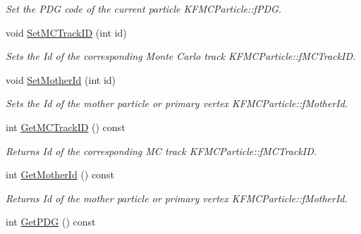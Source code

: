 \begin{DoxyCompactItemize}
\begin{DoxyCompactList}\small\item\em Set the P\+DG code of the current particle K\+F\+M\+C\+Particle\+::f\+P\+DG. \end{DoxyCompactList}\item 
void \hyperlink{classKFMCParticle_a4fe74ad782d04824601179c61085d82e}{Set\+M\+C\+Track\+ID} (int id)\hypertarget{classKFMCParticle_a4fe74ad782d04824601179c61085d82e}{}\label{classKFMCParticle_a4fe74ad782d04824601179c61085d82e}

\begin{DoxyCompactList}\small\item\em Sets the Id of the corresponding Monte Carlo track K\+F\+M\+C\+Particle\+::f\+M\+C\+Track\+ID. \end{DoxyCompactList}\item 
void \hyperlink{classKFMCParticle_aefeec3e0848ea6e94dfd48ba7dae077e}{Set\+Mother\+Id} (int id)\hypertarget{classKFMCParticle_aefeec3e0848ea6e94dfd48ba7dae077e}{}\label{classKFMCParticle_aefeec3e0848ea6e94dfd48ba7dae077e}

\begin{DoxyCompactList}\small\item\em Sets the Id of the mother particle or primary vertex K\+F\+M\+C\+Particle\+::f\+Mother\+Id. \end{DoxyCompactList}\item 
int \hyperlink{classKFMCParticle_adbf6a0b3aa66d2488e0dd35cd39e5307}{Get\+M\+C\+Track\+ID} () const \hypertarget{classKFMCParticle_adbf6a0b3aa66d2488e0dd35cd39e5307}{}\label{classKFMCParticle_adbf6a0b3aa66d2488e0dd35cd39e5307}

\begin{DoxyCompactList}\small\item\em Returns Id of the corresponding MC track K\+F\+M\+C\+Particle\+::f\+M\+C\+Track\+ID. \end{DoxyCompactList}\item 
int \hyperlink{classKFMCParticle_a1cd7e3ef51e4e2bb2ea3558feb5ab869}{Get\+Mother\+Id} () const \hypertarget{classKFMCParticle_a1cd7e3ef51e4e2bb2ea3558feb5ab869}{}\label{classKFMCParticle_a1cd7e3ef51e4e2bb2ea3558feb5ab869}

\begin{DoxyCompactList}\small\item\em Returns Id of the mother particle or primary vertex K\+F\+M\+C\+Particle\+::f\+Mother\+Id. \end{DoxyCompactList}\item 
int \hyperlink{classKFMCParticle_a9a26385ba40065086b9d6c0d0bbf4377}{Get\+P\+DG} () const \hypertarget{classKFMCParticle_a9a26385ba40065086b9d6c0d0bbf4377}{}\label{classKFMCParticle_a9a26385ba40065086b9d6c0d0bbf4377}


\end{DoxyCompactItemize}
